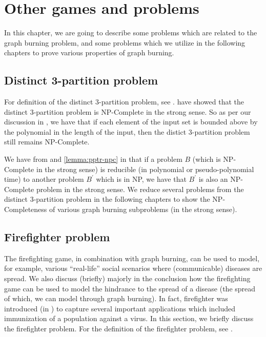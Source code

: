 \chapter{Other games and problems}\label{chapter:other-games-and-problems}

In this chapter, we are going to describe some problems which are related to the graph burning problem, and some problems which we utilize in the following chapters to prove various properties of graph burning.

\section{Distinct 3-partition problem}\label{section:d3pp}

For definition of the distinct 3-partition problem, see . \cite{Hulett2008} have showed that the distinct $3$-partition problem is NP-Complete in the strong sense. So as per our discussion in , we have that if each element of the input set is bounded above by the polynomial in the length of the input, then the distict 3-partition problem still remains NP-Complete.

We have from  and \cref{lemma:pptr-npc} in  that if a problem $B$ (which is NP-Complete in the strong sense) is reducible (in polynomial or pseudo-polynomial time) to another problem $B^\prime$ which is in NP, we have that $B^\prime$ is also an NP-Complete problem in the strong sense. We reduce several problems from the distinct 3-partition problem in the following chapters to show the NP-Completeness of various graph burning subproblems (in the strong sense).

\section{Firefighter problem}

The firefighting game, in combination with graph burning, can be used to model, for example, various ``real-life'' social scenarios where (communicable) diseases are spread. We also discuss (briefly) majorly in the conclusion how the firefighting game can be used to model the hindrance to the spread of a disease (the spread of which, we can model through graph burning). In fact, firefighter was introduced (in \cite{Hartnell1995}) to capture several important applications which included immunization of a population against a virus. In this section, we briefly discuss the firefighter problem. For the definition of the firefighter problem, see .

